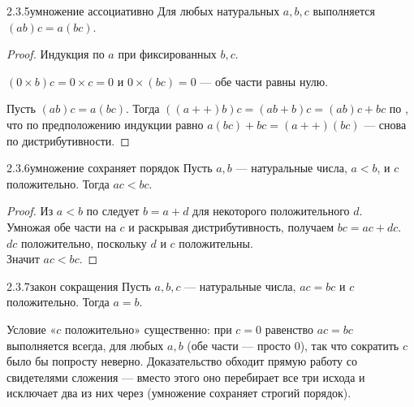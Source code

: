 \begin{proposition}{2.3.5}{умножение ассоциативно}
Для любых натуральных $a,b,c$ выполняется $(ab)c=a(bc)$.
\end{proposition}

\begin{proof}
Индукция по $a$ при фиксированных $b,c$.

 $(0 \times b)c = 0 \times c = 0$ и $0 \times (bc) = 0$ — обе части равны
нулю.

 Пусть $(ab)c=a(bc)$. Тогда $((a{+}{+})b)c=(ab+b)c=(ab)c+bc$ по
, что по предположению индукции равно
$a(bc)+bc=(a{+}{+})(bc)$ — снова по дистрибутивности.
\end{proof}

\begin{proposition}{2.3.6}{умножение сохраняет порядок}
Пусть $a,b$ — натуральные числа, $a<b$, и $c$ положительно. Тогда $ac<bc$.
\end{proposition}

\begin{proof}
Из $a<b$ по  следует $b=a+d$ для некоторого
положительного $d$.\\
Умножая обе части на $c$ и раскрывая дистрибутивность, получаем $bc=ac+dc$.\\
$dc$ положительно, поскольку $d$ и $c$ положительны.\\
Значит $ac<bc$.
\end{proof}

\begin{corollary}{2.3.7}{закон сокращения}
Пусть $a,b,c$ — натуральные числа, $ac=bc$ и $c$ положительно. Тогда $a=b$.
\end{corollary}

\begin{intuition}
Условие «$c$ положительно» существенно: при $c=0$ равенство $ac=bc$ выполняется всегда,
для любых $a,b$ (обе части — просто $0$), так что сократить $c$ было бы попросту неверно.
Доказательство обходит прямую работу со свидетелями сложения — вместо этого оно перебирает
все три исхода  и исключает два из них через
 (умножение сохраняет строгий порядок).
\end{intuition}

